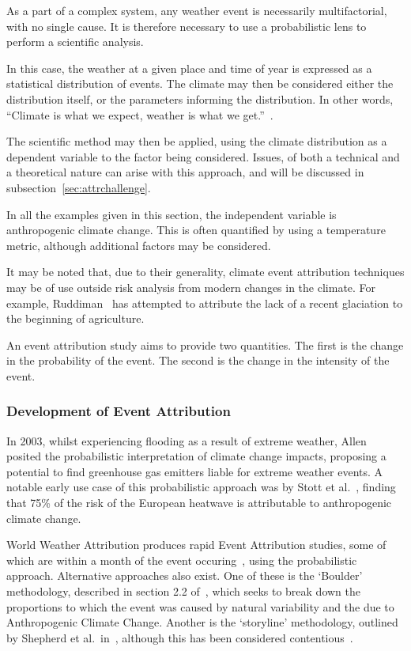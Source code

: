 As a part of a complex system,
    any weather event is necessarily multifactorial,
    with no single cause.
It is therefore necessary to use a probabilistic lens to perform a scientific analysis.

In this case, the weather at a given place and time of year is expressed as a statistical distribution of events.
The climate may then be considered either the distribution itself,
    or the parameters informing the distribution.
In other words, ``Climate is what we expect, weather is what we get.''~\cite{Herbertson_1935}.

The scientific method may then be applied,
    using the climate distribution as a dependent variable to the factor being considered.
Issues, of both a technical and a theoretical nature can arise with this approach,
    and will be discussed in subsection~\ref{sec:attrchallenge}.

In all the examples given in this section,
    the independent variable is anthropogenic climate change.
This is often quantified by using a temperature metric,
    although additional factors may be considered.

It may be noted that,
    due to their generality,
    climate event attribution techniques may be of use outside risk analysis from modern changes in the climate.
For example,
    Ruddiman~\cite{Ruddiman_2010} has attempted to attribute the lack of a recent glaciation to the beginning of agriculture.

An event attribution study aims to provide two quantities.
The first is the change in the probability of the event.
The second is the change in the intensity of the event.

\subsubsection{Development of Event Attribution}

In 2003, whilst experiencing flooding as a result of extreme weather,
    Allen~\cite{Allen_2003} posited the probabilistic interpretation of climate change impacts,
    proposing a potential to find greenhouse gas emitters liable for extreme weather events.
A notable early use case of this probabilistic approach was by Stott et al.~\cite{Stott_2004},
    finding that 75\% of the risk of the European heatwave is attributable to anthropogenic climate change.

World Weather Attribution produces rapid Event Attribution studies,
    some of which are within a month of the event occuring~\cite{van_Oldenborgh_et_al_2018},
    using the probabilistic approach.
Alternative approaches also exist.
One of these is the `Boulder' methodology,
    described in section 2.2 of~\cite{Otto_2017},
    which seeks to break down the proportions to which the event was caused by natural variability and the due to Anthropogenic Climate Change.
Another is the `storyline' methodology,
    outlined by Shepherd et al.\ in~\cite{Shepherd_et_al_2018},
    although this has been considered contentious~\cite{García-Portela_Maraun_2023}.

